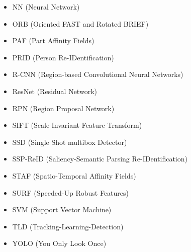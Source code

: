 \begin{itemize}
	\item NN (Neural Network)
	\item ORB (Oriented FAST and Rotated BRIEF)
	\item PAF (Part Affinity Fields)
	\item PRID (Person Re-IDentification)
	\item R-CNN (Region-based Convolutional Neural Networks)
	\item ResNet (Residual Network)
	\item RPN (Region Proposal Network)
	\item SIFT (Scale-Invariant Feature Transform)
	\item SSD (Single Shot multibox Detector)
	\item SSP-ReID (Saliency-Semantic Parsing Re-IDentification)
	\item STAF (Spatio-Temporal Affinity Fields)
	\item SURF (Speeded-Up Robust Features)
	\item SVM (Support Vector Machine)
	\item TLD (Tracking-Learning-Detection)
	\item YOLO (You Only Look Once)
\end{itemize}



